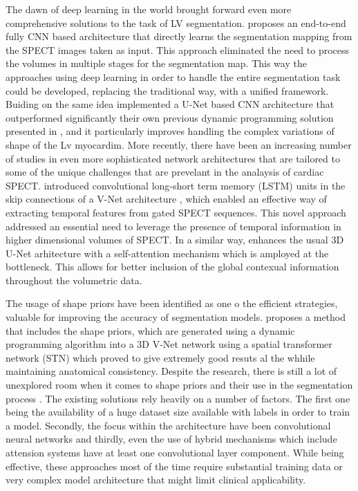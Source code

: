The dawn of deep learning in the world brought forward even more comprehensive solutions to the task of LV segmentation. \cite{Wang2020} proposes an end-to-end fully CNN based architecture that directly learns the segmentation mapping from the SPECT images taken as input. This approach eliminated the need to process the volumes in multiple stages for the segmentation map. This way the approaches using deep learning in order to handle the entire segmentation task could be developed, replacing the traditional way, with a unified framework. Buiding on the same idea \cite{WEN2021166842} implemented a U-Net \cite{RFB15a} based CNN architecture that outperformed significantly their own previous dynamic programming solution presented in \cite{tang2017dynamic}, and it particularly improves handling the complex variations of shape of the Lv myocardim. More recently, there have been an increasing number of studies in even more sophisticated network architectures that are tailored to some of the unique challenges that are prevelant in the analaysis of cardiac SPECT. \cite{zhao2023spatial} introduced convolutional long-short term memory (LSTM) units in the skip connections of a V-Net architecture \cite{7785132}, which enabled an effective way of extracting temporal features from gated SPECT sequences. This novel approach addressed an essential need to leverage the presence of temporal information in higher dimensional volumes of SPECT. In a similar way, \cite{ZHANG2023107267} enhances the usual 3D U-Net arhitecture with a self-attention mechanism which is amployed at the bottleneck. This allows for better inclusion of the global contexual information throughout the volumetric data.

The usage of shape priors have been identified as one o the efficient strategies, valuable for improving the accuracy of segmentation models. \cite{ZHU2023106954} proposes a method that includes the shape priors, which are generated using a dynamic programming algorithm into a 3D V-Net network using a spatial transformer network (STN) which proved to give extremely good resuts al the whhile maintaining anatomical consistency. Despite the research, there is still a lot of unexplored room when it comes to shape priors and their use in the segmentation process \cite{Wang2020}. The existing solutions rely heavily on a number of factors. The first one being the availability of a huge dataset size available with labels in order to train a model. Secondly, the focus within the architecture have been convolutional neural networks and thirdly, even the use of hybrid mechanisms which include attension systems have at least one convolutional layer component. While being effective, these approaches most of the time require substantial training data or very complex model architecture that might limit clinical applicability.